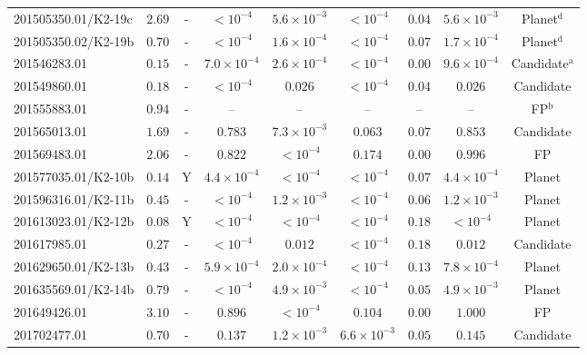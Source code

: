 \begin{landscape}
{\begin{longtable}{lcccccccc}
201505350.01/K2-19c & $2.69$ &  - & $< 10^{-4}$ & $5.6\times10^{-3}$ & $< 10^{-4}$ & $0.04$ & $5.6\times10^{-3}$ & Planet$^{\textrm{d}}$  \\
201505350.02/K2-19b & $0.70$ &  - & $< 10^{-4}$ & $1.6\times10^{-4}$ & $< 10^{-4}$ & $0.07$ & $1.7\times10^{-4}$ & Planet$^{\textrm{d}}$  \\
201546283.01 & $0.15$ &  - & $7.0\times10^{-4}$ & $2.6\times10^{-4}$ & $< 10^{-4}$ & $0.00$ & $9.6\times10^{-4}$ & Candidate$^{\textrm{a}}$  \\
201549860.01 & $0.18$ &  - & $< 10^{-4}$ & $0.026$ & $< 10^{-4}$ & $0.04$ & $0.026$ & Candidate  \\
 \color{red} 201555883.01  & \color{red}  $0.94$  & \color{red}   -  & \color{red}   --  & \color{red}   --  & \color{red}   --  & \color{red}   --  & \color{red}  --  & \color{red}  FP$^{\textrm{b}}$ \\
201565013.01 & $1.69$ &  - & $0.783$ & $7.3\times10^{-3}$ & $0.063$ & $0.07$ & $0.853$ & Candidate  \\
 \color{red} 201569483.01  & \color{red}  $2.06$  & \color{red}   -  & \color{red}  $0.822$  & \color{red}  $< 10^{-4}$  & \color{red}  $0.174$  & \color{red}  $0.00$  & \color{red}  $0.996$  & \color{red}  FP \\
201577035.01/K2-10b & $0.14$ &  Y & $4.4\times10^{-4}$ & $< 10^{-4}$ & $< 10^{-4}$ & $0.07$ & $4.4\times10^{-4}$ & Planet  \\
201596316.01/K2-11b & $0.45$ &  - & $< 10^{-4}$ & $1.2\times10^{-3}$ & $< 10^{-4}$ & $0.06$ & $1.2\times10^{-3}$ & Planet  \\
201613023.01/K2-12b & $0.08$ &  Y & $< 10^{-4}$ & $< 10^{-4}$ & $< 10^{-4}$ & $0.18$ & $< 10^{-4}$ & Planet  \\
201617985.01 & $0.27$ &  - & $< 10^{-4}$ & $0.012$ & $< 10^{-4}$ & $0.18$ & $0.012$ & Candidate  \\
201629650.01/K2-13b & $0.43$ &  - & $5.9\times10^{-4}$ & $2.0\times10^{-4}$ & $< 10^{-4}$ & $0.13$ & $7.8\times10^{-4}$ & Planet  \\
201635569.01/K2-14b & $0.79$ &  - & $< 10^{-4}$ & $4.9\times10^{-3}$ & $< 10^{-4}$ & $0.05$ & $4.9\times10^{-3}$ & Planet  \\
 \color{red} 201649426.01  & \color{red}  $3.10$  & \color{red}   -  & \color{red}  $0.896$  & \color{red}  $< 10^{-4}$  & \color{red}  $0.104$  & \color{red}  $0.00$  & \color{red}  $1.000$  & \color{red}  FP \\
201702477.01 & $0.70$ &  - & $0.137$ & $1.2\times10^{-3}$ & $6.6\times10^{-3}$ & $0.05$ & $0.145$ & Candidate  \\

\end{longtable}}
\end{landscape}
